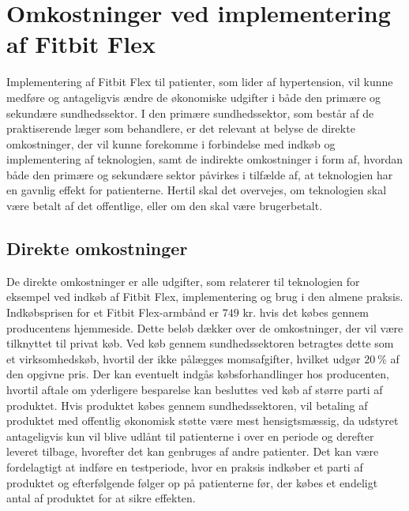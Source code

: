 \section{Omkostninger ved implementering af Fitbit Flex} \label{sec:armbaand_omkost}

Implementering af Fitbit Flex til patienter, som lider af hypertension, vil kunne medføre og antageligvis ændre de økonomiske udgifter i både den primære og sekundære sundhedssektor. I den primære sundhedssektor, som består af de praktiserende læger som behandlere, er det relevant at belyse de direkte omkostninger, der vil kunne forekomme i forbindelse med indkøb og implementering af teknologien, samt de indirekte omkostninger i form af, hvordan både den primære og sekundære sektor påvirkes i tilfælde af, at teknologien har en gavnlig effekt for patienterne. Hertil skal det overvejes, om teknologien skal være betalt af det offentlige, eller om den skal være brugerbetalt. 

\subsection{Direkte omkostninger} \label{sec:dir_omkost}
De direkte omkostninger er alle  udgifter, som relaterer til teknologien for eksempel ved indkøb af Fitbit Flex, implementering og brug i den almene praksis.  
Indkøbsprisen for et Fitbit Flex-armbånd er $749$ kr. hvis det købes gennem producentens hjemmeside. Dette beløb dækker over de omkostninger, der vil være tilknyttet til privat køb. 
Ved køb gennem sundhedssektoren betragtes dette som et virksomhedskøb, hvortil der ikke pålægges momsafgifter, hvilket udgør $20~\%$ af den opgivne pris. 
Der kan eventuelt indgås købsforhandlinger hos producenten, hvortil aftale om yderligere besparelse kan besluttes ved køb af større parti af produktet. Hvis produktet købes gennem sundhedssektoren, vil betaling af produktet med offentlig økonomisk støtte være mest hensigtsmæssig, da udstyret antageligvis kun vil blive udlånt til patienterne i over en periode og derefter leveret tilbage, hvorefter det kan genbruges af andre patienter. Det kan være fordelagtigt at indføre en testperiode, hvor en praksis indkøber et parti af produktet og efterfølgende følger op på patienterne før, der købes et endeligt antal af produktet for at sikre effekten. 

